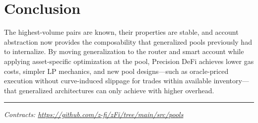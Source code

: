 \documentclass[10pt,twocolumn]{article}
\begin{document}
\section{Conclusion}

The highest-volume pairs are known, their properties are stable, and account abstraction now provides the composability that generalized pools previously had to internalize. By moving generalization to the router and smart account while applying asset-specific optimization at the pool, Precision DeFi achieves lower gas costs, simpler LP mechanics, and new pool designs---such as oracle-priced execution without curve-induced slippage for trades within available inventory---that generalized architectures can only achieve with higher overhead.

\vspace{6pt}
\noindent\rule{\columnwidth}{0.4pt}
\vspace{2pt}

{\small\itshape Contracts: \url{https://github.com/z-fi/zFi/tree/main/src/pools}}
\end{document}
